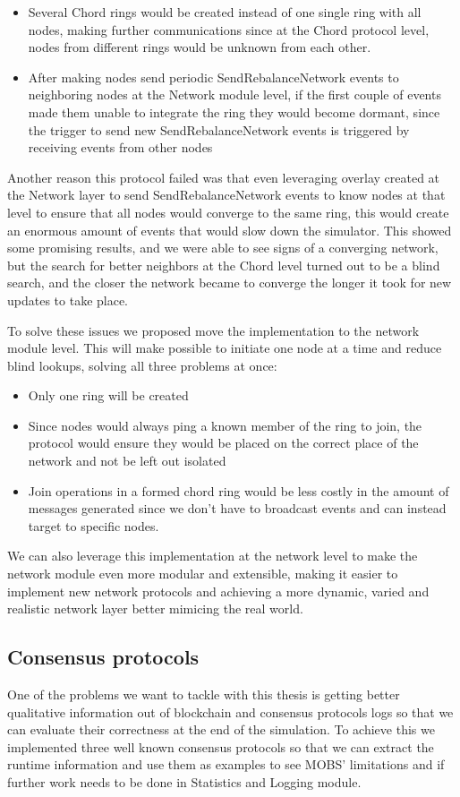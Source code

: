 \begin{itemize}
  \item Several Chord rings would be created instead of one single ring with all nodes,
making further communications since at the Chord protocol level, nodes from different rings
would be unknown from each other.
  \item After making nodes send periodic SendRebalanceNetwork events to neighboring
nodes at the Network module level, if the first couple of events made them unable to
integrate the ring they would become dormant, since the trigger to send  new
SendRebalanceNetwork events is triggered  by receiving events from other nodes
\end{itemize}

Another reason this protocol failed was that even leveraging overlay created at
the Network layer to send SendRebalanceNetwork events to know nodes at that level
to ensure that all nodes would converge to the same ring, this would create an enormous
amount of events that would slow down the simulator. This showed some promising results,
and we were able to see signs of a converging network, but the search for better neighbors
at the Chord level turned out to be a blind search, and the closer the network became to
converge the longer it took for new updates to take place.

To solve these issues we proposed move the implementation to the network module level.
This will make possible to initiate one node at a time and reduce blind lookups, solving
all three problems at once: 
\begin{itemize}
  \item Only one ring will be created
  \item Since nodes would always ping a known
member of the ring to join, the protocol would ensure they would be placed on the correct place
of the network and not be left out isolated
  \item Join operations in a formed chord ring would be less costly in the amount
of messages generated since we don't have to broadcast events and can instead target
to specific nodes.
\end{itemize}

We can also leverage this implementation at the network level to make the network
module even more modular and extensible, making it easier to implement new network protocols
and achieving a more dynamic, varied and realistic network layer better mimicing the real world.

\subsection{Consensus protocols}\label{sub:consensus_protocols_implemented}
One of the problems we want to tackle with this thesis is getting better qualitative information out of
blockchain and consensus protocols logs so that we can evaluate their correctness at the end 
of the simulation. To achieve this we implemented three well known consensus protocols
so that we can extract the runtime information and use them as examples to see MOBS' limitations
and if further work needs to be done in Statistics and Logging module.

